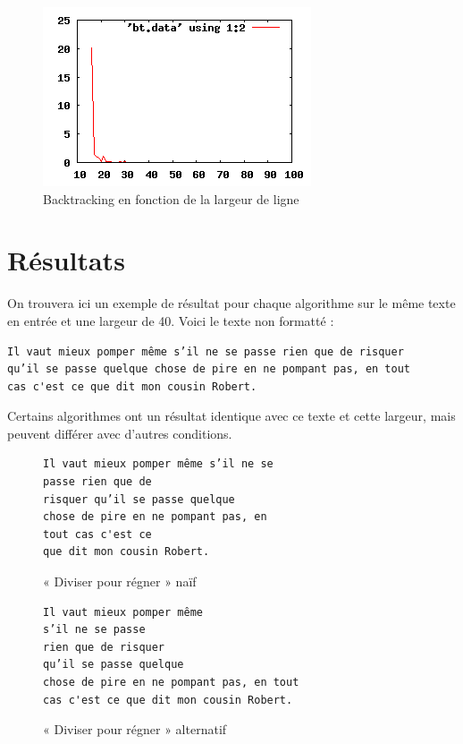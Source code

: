 \documentclass[a4paper, 11pt]{article}
\begin{document}
\begin{figure}[!h]
    \centering
    \includegraphics{bt.png}
    \caption{Backtracking en fonction de la largeur de ligne}
\end{figure}

\part{Résultats}

On trouvera ici un exemple de résultat pour chaque algorithme sur le même texte
en entrée et une largeur de 40. Voici le texte non formatté :

\begin{verbatim}
Il vaut mieux pomper même s’il ne se passe rien que de risquer
qu’il se passe quelque chose de pire en ne pompant pas, en tout
cas c'est ce que dit mon cousin Robert.
\end{verbatim}

Certains algorithmes ont un résultat identique avec ce texte et cette largeur,
mais peuvent différer avec d'autres conditions.

\begin{figure}[!h]
\begin{verbatim}
Il vaut mieux pomper même s’il ne se
passe rien que de
risquer qu’il se passe quelque
chose de pire en ne pompant pas, en
tout cas c'est ce
que dit mon cousin Robert.
\end{verbatim}
\caption{« Diviser pour régner » naïf}
\end{figure}

\begin{figure}[!h]
\begin{verbatim}
Il vaut mieux pomper même
s’il ne se passe
rien que de risquer
qu’il se passe quelque
chose de pire en ne pompant pas, en tout
cas c'est ce que dit mon cousin Robert.
\end{verbatim}
\caption{« Diviser pour régner » alternatif}
\end{figure}
\end{document}
